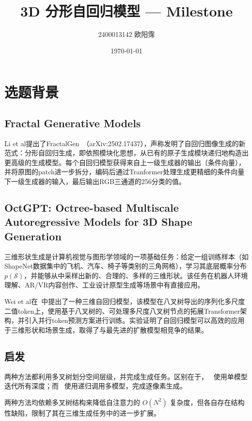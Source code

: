 \documentclass[12pt,a4paper]{article}
\title{3D 分形自回归模型 — Milestone}
\author{2400013142 欧阳霈}
\date{\today}
\begin{document}
\maketitle

\section{选题背景}

\subsection{Fractal Generative Models}

Li et al提出了FractalGen~\cite{li2025fractalgenerativemodels}（arXiv:2502.17437），声称发明了自回归图像生成的新范式：分形自回归生成，即依照模块化思想，从已有的原子生成模块递归地构造出更高级的生成模型。每个自回归模型获得来自上一级生成器的输出（条件向量），并将原图的patch进一步拆分，编码后通过Tranformer处理生成更精细的条件向量下一级生成器的输入，最后输出RGB三通道的256分类的值。

\subsection{OctGPT: Octree-based Multiscale Autoregressive Models for 3D Shape Generation}
三维形状生成是计算机视觉与图形学领域的一项基础任务：给定一组训练样本（如ShapeNet数据集中的飞机、汽车、椅子等类别的三角网格），学习其底层概率分布$p(\mathcal{S})$，并能够从中采样出新的、合理的、多样的三维形状。该任务在机器人环境理解、AR/VR内容创作、工业设计原型生成等场景中有直接应用。

Wei et al在~\cite{wei2025octgptoctreebasedmultiscaleautoregressive}中提出了一种三维自回归模型，该模型在八叉树导出的序列化多尺度二值token上，使用基于八叉树的、可处理多尺度八叉树节点的拓展Transformer架构，并引入并行token预测方案进行训练。实验证明了自回归模型可以高效的应用于三维形状和场景生成，取得了与最先进的扩散模型相竞争的结果。


\subsection{启发}

两种方法都利用多叉树划分空间层级，并完成生成任务。区别在于，~\cite{wei2025octgptoctreebasedmultiscaleautoregressive} 使用单模型迭代所有深度；而~\cite{li2025fractalgenerativemodels} 使用递归调用多模型，完成逐像素生成。

两种方法均依赖多叉树结构来降低自注意力的 $O(N^2)$ 复杂度，但各自存在结构性缺陷，限制了其在三维生成任务中的进一步扩展。
\end{document}
